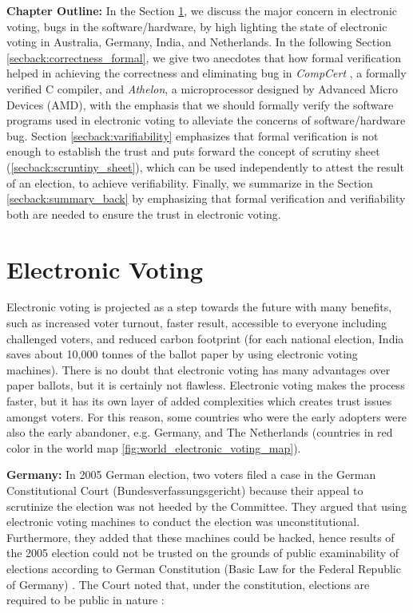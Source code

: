  
\textbf{Chapter Outline:}
 In the Section \ref{secback:electronic_voting}, we discuss 
 the major concern in electronic voting, bugs in the software/hardware, 
 by high lighting the 
 state of electronic voting in Australia, Germany, India, 
 and Netherlands. In the following Section \ref{secback:correctness_formal}, we  give 
 two anecdotes that how formal verification helped in achieving 
 the correctness and eliminating bug in \textit{CompCert} \citep{DBLP:conf/popl/Leroy06},  a formally verified C compiler, 
 and \textit{Athelon}, a microprocessor designed by Advanced Micro Devices (AMD), with 
 the emphasis that we should formally verify the software programs
 used in electronic voting to alleviate the concerns of 
 software/hardware bug. Section \ref{secback:varifiability} 
 emphasizes that formal verification is not enough
 to establish the trust and puts forward the concept of 
 scrutiny sheet (\ref{secback:scruntiny_sheet}), which 
 can be used independently to attest the result of an election, 
 to achieve verifiability. Finally, we summarize in the Section \ref{secback:summary_back}
 by emphasizing that formal verification and verifiability both are needed 
 to ensure the trust in electronic voting. 
 
  

\section{Electronic Voting}
 \label{secback:electronic_voting}
  Electronic voting is projected as a step towards the future with 
  many benefits, such as increased voter turnout, faster result, 
  accessible to everyone including challenged voters, and reduced 
  carbon footprint (for each 
  national election, India saves about 10,000 tonnes of the ballot 
  paper by using electronic voting machines). 
  There is no doubt that electronic voting has many advantages 
  over paper ballots, but it is certainly not flawless.  
  Electronic voting makes 
  the process faster, but it has its own layer of added complexities 
  which creates trust issues amongst voters. For this reason, some countries 
  who were the early adopters were also the early abandoner, e.g.
  Germany, and The Netherlands (countries in red color in the world map 
  \ref{fig:world_electronic_voting_map}).
  
  
  \textbf{Germany:} In 2005 German election, two voters filed a case in the German 
  Constitutional Court (Bundesverfassungsgericht) because their 
  appeal to scrutinize the election 
  was not heeded by the Committee. They argued that using electronic 
  voting machines to conduct the election was unconstitutional. Furthermore,
  they added that
  these machines could be hacked, hence results of the 2005 election 
  could not be trusted on the grounds 
  of public examinability of elections according to German Constitution 
  (Basic Law for the Federal Republic of Germany) \citep{Germanconst}. 
  The Court noted that, under the constitution, elections are 
  required to be public in nature \citep{Germanconst}:
  
